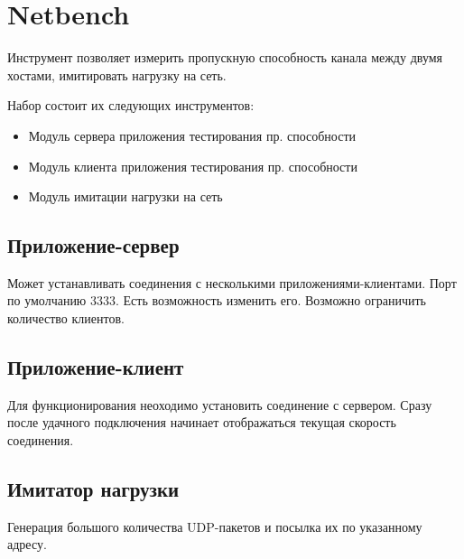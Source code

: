 \documentclass[a4paper, 12pt]{article}
\begin{document}
\section*{Netbench}
Инструмент позволяет измерить пропускную способность канала между двумя хостами, 
имитировать нагрузку на сеть.

Набор состоит их следующих инструментов:
\begin{itemize}
	\item Модуль сервера приложения тестирования пр. способности
	\item Модуль клиента приложения тестирования пр. способности
	\item Модуль имитации нагрузки на сеть
\end{itemize}

\subsection*{Приложение-сервер}
Может устанавливать соединения с несколькими приложениями-клиентами.
Порт по умолчанию 3333. Есть возможность изменить его. 
Возможно ограничить количество клиентов.
\subsection*{Приложение-клиент}
Для функционирования неоходимо установить соединение с сервером.
Сразу после удачного подключения начинает отображаться текущая скорость соединения.
\subsection*{Имитатор нагрузки}
Генерация большого количества UDP-пакетов и посылка их по указанному адресу.
\newpage

%
\end{document}
